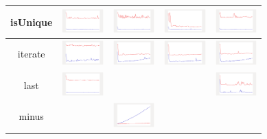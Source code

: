 \begin{longtable}{ c|c c c c}
isUnique
&
\includegraphics[width=1.6cm]{graphs/sequence/small/isUnique}
&
\includegraphics[width=1.6cm]{graphs/set/small/isUnique}
&
\includegraphics[width=1.6cm]{graphs/bag/small/isUnique}
&
\includegraphics[width=1.6cm]{graphs/orderedset/small/isUnique}
\\\hline

iterate
&
\includegraphics[width=1.6cm]{graphs/sequence/small/Iterate}
&
\includegraphics[width=1.6cm]{graphs/set/small/Iterate}
&
\includegraphics[width=1.6cm]{graphs/bag/small/Iterate}
&
\includegraphics[width=1.6cm]{graphs/orderedset/small/Iterate}
\\\hline

last
&
\includegraphics[width=1.6cm]{graphs/sequence/small/Last}
&
&
&
\includegraphics[width=1.6cm]{graphs/orderedset/small/Last}
\\\hline

minus
&
&
\includegraphics[width=1.6cm]{graphs/set/small/Minus}
&
&
\\\hline


\end{longtable}
